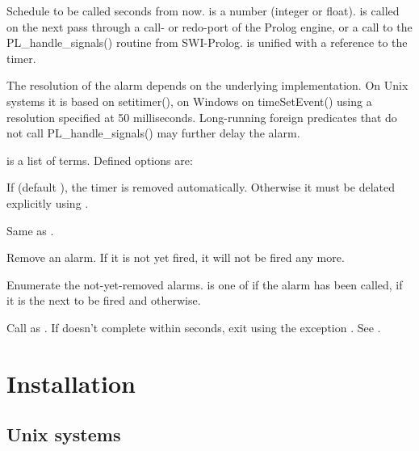 \documentclass[11pt]{article}
\begin{document}
\begin{description}
Schedule  to be called  seconds from now.
 is a number (integer or float).   is called
on the next pass through a call- or redo-port of the Prolog engine,
or a call to the PL_handle_signals() routine from SWI-Prolog.  
is unified with a reference to the timer.

The resolution of the alarm depends on the underlying implementation.
On Unix systems it is based on setitimer(), on Windows on timeSetEvent()
using a resolution specified at 50 milliseconds.  Long-running foreign
predicates that do not call PL_handle_signals() may further delay the
alarm.

 is a list of  terms.  Defined 
options are:

\begin{description}
If  (default ), the timer is removed
automatically.  Otherwise it must be delated explicitly using
.
\end{description}

Same as .

Remove an alarm.  If it is not yet fired, it will not be fired
any more.

Enumerate the not-yet-removed alarms.   is one of
 if the alarm has been called,  if it
is the next to be fired and  otherwise.

Call  as .  If  doesn't complete within
 seconds, exit using the exception
.  See .
\end{description}


\section{Installation}

\subsection{Unix systems}
\end{document}
